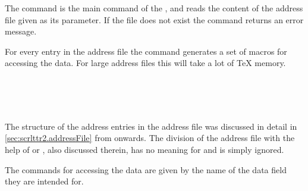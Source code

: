 \begin{Declaration}
\end{Declaration}%
%
%
The command  is the main command of the
, and reads the content of the address
file given as its parameter.  If the file does not
exist the command returns an error message.

For every entry in the address file the command generates a set of
macros for accessing the data. For large address files this will take
a lot of {\TeX} memory. 

\begin{Declaration}%
  \\
  \\
  \\
\end{Declaration}%
%
%
%
%

The structure of the address entries in the address file was discussed
in detail in \autoref{sec:scrlttr2.addressFile} from
 onwards.  The division of
the address file with the help of  or ,
also discussed therein, has no meaning for  and is
simply ignored.

The commands for accessing the data are given by the name of the data
field they are intended for.
\begin{Declaration}
\\
\\
\\
\\
\\
\\
\\
\\
\\
\end{Declaration}%
%
%
%
%
%


